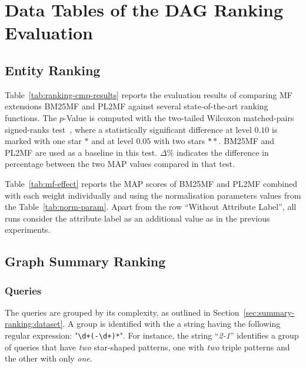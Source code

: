 \chapter{Data Tables of the DAG Ranking Evaluation}

\section{Entity Ranking}

Table~\ref{tab:ranking-cmp-results} reports the evaluation results of comparing \gls{MF} extensions \gls{BM25MF} and \gls{PL2MF} against several state-of-the-art ranking functions. The $p$-Value is computed with the two-tailed Wilcoxon matched-pairs signed-ranks test~\cite{sheskin:2003:CRC,buttcher:2010:IRI:1869919}, where a statistically significant difference at level $0.10$ is marked with one star $*$ and at level $0.05$ with two stars $**$. \gls{BM25MF} and \gls{PL2MF} are used as a baseline in this test. $\Delta\%$ indicates the difference in percentage between the two MAP values compared in that test.




Table~\ref{tab:mf-effect} reports the MAP scores of \gls{BM25MF} and \gls{PL2MF} combined with each weight individually and using the normalisation parameters values from the Table~\ref{tab:norm-param}. Apart from the row ``Without Attribute Label'', all runs consider the attribute label as an additional value as in the previous experiments.



\section{Graph Summary Ranking}
\label{appendix:ranking}

\subsection{Queries}

The queries are grouped by its complexity, as outlined in Section~\ref{sec:summary-ranking:dataset}. A group is identified with the a string having the following regular expression: "\verb/\d+(-\d+)*/". For instance, the string ``\emph{2-1}'' identifies a group of queries that have \textit{two} star-shaped patterns, one with \textit{two} triple patterns and the other with only \textit{one}.

